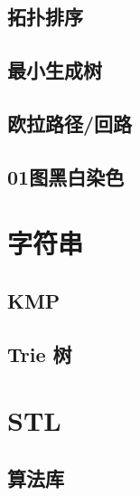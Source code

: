 \documentclass{article}
\begin{document}
\subsection{拓扑排序}

\subsection{最小生成树}

\subsection{欧拉路径/回路}

\subsection{01图黑白染色}

\section{字符串}

\subsection{KMP}

\subsection{Trie 树}

\section{STL}

\subsection{算法库}


\end{document}

